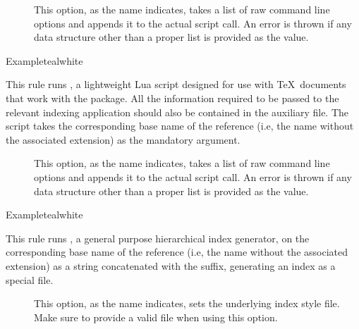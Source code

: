 \begin{description}
\begin{description}
\item[] This option, as the name indicates, takes a list of raw command line options and appends it to the actual script call. An error is thrown if any data structure other than a proper list is provided as the value.
\end{description}

\begin{codebox}{Example}{teal}{\icnote}{white}
\end{codebox}

\item[\rulebox{makeglossarieslite}]
This rule runs , a lightweight Lua script designed for use with \TeX\ documents that work with the  package. All the information required to be passed to the relevant indexing application should also be contained in the auxiliary file. The script takes the corresponding base name of the  reference (i.e, the name without the associated extension) as the mandatory argument.

\begin{description}
\item[] This option, as the name indicates, takes a list of raw command line options and appends it to the actual script call. An error is thrown if any data structure other than a proper list is provided as the value.
\end{description}

\begin{codebox}{Example}{teal}{\icnote}{white}
\end{codebox}

\item[\rulebox{makeindex}]
This rule runs , a general purpose hierarchical index generator, on the corresponding base name of the  reference (i.e, the name without the associated extension) as a string concatenated with the  suffix, generating an index as a special  file.

\begin{description}
\item[] This option, as the name indicates, sets the underlying index style file. Make sure to provide a valid  file when using this option.


\end{description}
\end{description}
